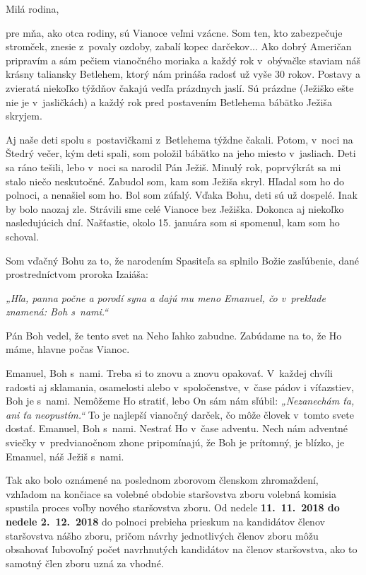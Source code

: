 


Milá rodina,

pre mňa, ako otca rodiny, sú Vianoce veľmi vzácne. Som ten, kto zabezpečuje stromček, znesie z~povaly ozdoby, zabalí kopec darčekov... Ako dobrý Američan pripravím a sám pečiem vianočného moriaka a každý rok v~obývačke staviam náš krásny taliansky Betlehem, ktorý nám prináša radosť už vyše 30 rokov. Postavy a zvieratá niekoľko týždňov čakajú vedľa prázdnych jaslí. Sú prázdne (Ježiško ešte nie je v~jasličkách) a každý rok pred postavením Betlehema bábätko Ježiša skryjem.

Aj naše deti spolu s~postavičkami z~Betlehema týždne čakali. Potom, v~noci na Štedrý večer, kým deti spali, som položil bábätko na jeho miesto v~jasliach. Deti sa ráno tešili, lebo v~noci sa narodil Pán Ježiš. Minulý rok, poprvýkrát sa mi stalo niečo neskutočné. Zabudol som, kam som Ježiša skryl. Hľadal som ho do polnoci, a nenašiel som ho. Bol som zúfalý. Vďaka Bohu, deti sú už dospelé. Inak by bolo naozaj zle. Strávili sme celé Vianoce bez Ježiška. Dokonca aj niekoľko nasledujúcich dní. Našťastie, okolo 15. januára som si spomenul, kam som ho schoval.

Som vďačný Bohu za to, že narodením Spasiteľa sa splnilo Božie zasľúbenie, dané prostredníctvom proroka Izaiáša:

{\it„Hľa, panna počne a porodí syna a dajú mu meno Emanuel, čo v~preklade znamená: Boh s~nami.“}

Pán Boh vedel, že tento svet na Neho ľahko zabudne. Zabúdame na to, že Ho máme, hlavne počas Vianoc.

Emanuel, Boh s~nami. Treba si to znovu a znovu opakovať. V~každej chvíli radosti aj sklamania, osamelosti alebo v~spoločenstve, v~čase pádov i víťazstiev, Boh je s~nami. Nemôžeme Ho stratiť, lebo On sám nám sľúbil: {\it„Nezanechám ťa, ani ťa neopustím.“} To je najlepší vianočný darček, čo môže človek v~tomto svete dostať. Emanuel, Boh s~nami. Nestrať Ho v~čase adventu. Nech nám adventné sviečky v~predvianočnom zhone pripomínajú, že Boh je prítomný, je blízko, je Emanuel, náš Ježiš s~nami.



Tak ako bolo oznámené na poslednom zborovom členskom zhromaždení, vzhľadom na končiace sa volebné obdobie staršovstva zboru volebná komisia spustila proces voľby nového staršovstva zboru. Od nedele {\bf 11.~11.~2018 do nedele 2.~12.~2018} do polnoci prebieha prieskum na kandidátov členov staršovstva nášho zboru, pričom návrhy jednotlivých členov zboru môžu obsahovať ľubovoľný počet navrhnutých kandidátov na členov staršovstva, ako to samotný člen zboru uzná za vhodné.

